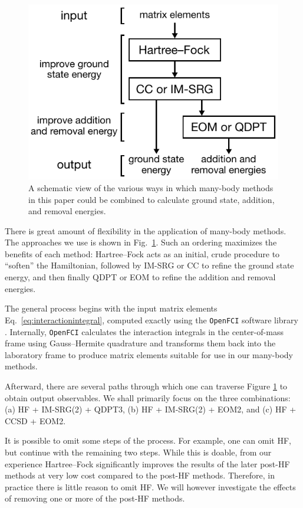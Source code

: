 \begin{figure}
  \centering 
  \includegraphics{figures/fig-methods.pdf} 
  \caption{A schematic view of the various ways in which many-body methods in
  this paper could be combined to calculate ground state, addition,
  and removal energies.}  \label{fig:methods}
\end{figure}

There is great amount of flexibility in the application of many-body
methods.  The approaches we use is shown in
Fig.~\ref{fig:methods}.  Such an ordering maximizes the benefits of
each method: Hartree--Fock acts as an initial, crude procedure to
``soften'' the Hamiltonian, followed by IM-SRG or CC to refine the
ground state energy, and then finally QDPT or EOM to refine the
addition and removal energies.

The general process begins with the input matrix elements
Eq.~\eqref{eq:interactionintegral}, computed exactly using
the \texttt{OpenFCI} software library \cite{2008arXiv0810.2644K}.
Internally, \texttt{OpenFCI} calculates the interaction integrals in
the center-of-mass frame using Gauss--Hermite quadrature and
transforms them back into the laboratory frame to produce matrix
elements suitable for use in our many-body methods.

Afterward, there are several paths through which one can traverse
Figure \ref{fig:methods} to obtain output observables.  We shall
primarily focus on the three combinations: (a) HF + IM-SRG(2) + QDPT3,
(b) HF + IM-SRG(2) + EOM2, and (c) HF + CCSD + EOM2.

It is possible to omit some steps of the process.  For example, one
can omit HF, but continue with the remaining two steps.  While this is
doable, from our experience Hartree--Fock significantly improves the
results of the later post-HF methods at very low cost compared to the
post-HF methods.  Therefore, in practice there is little reason to
omit HF.  We will however investigate the effects of removing one or
more of the post-HF methods.

